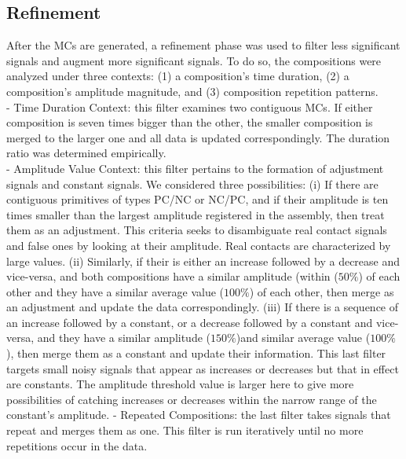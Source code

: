 \subsection{Refinement} \label{subsubsec:Refinement1}
After the MCs are generated, a refinement phase was used to filter less significant signals and augment more significant signals. To do so, the compositions were analyzed under three contexts: (1) a composition's time duration, (2) a composition's amplitude magnitude, and (3) composition repetition patterns.\\
- Time Duration Context: this filter examines two contiguous MCs. If either composition is seven times bigger than the other, the smaller composition is merged to the larger one and all data is updated correspondingly. The duration ratio was determined empirically.\\
- Amplitude Value Context: this filter pertains to the formation of adjustment signals and constant signals. We considered three possibilities:
(i) If there are contiguous primitives of types PC/NC or NC/PC, and if their amplitude is ten times smaller than the largest amplitude registered in the assembly, then treat them as an adjustment. This criteria seeks to disambiguate real contact signals and false ones by looking at their amplitude. Real contacts are characterized by large values.
(ii) Similarly, if their is either an increase followed by a decrease and vice-versa, and both compositions have a similar amplitude (within ($50\%$) of each other and they have a similar average value ($100\%$) of each other, then merge as an adjustment and update the data correspondingly.
(iii) If there is a sequence of an increase followed by a constant, or a decrease followed by a constant and vice-versa, and they have a similar amplitude ($150\%$)and similar average value ($100\%$), then merge them as a constant and update their information. This last filter targets small noisy signals that appear as increases or decreases but that in effect are constants. The amplitude threshold value is larger here to give more possibilities of catching increases or decreases within the narrow range of the constant's amplitude.
- Repeated Compositions: the last filter takes signals that repeat and merges them as one. This filter is run iteratively until no more repetitions occur in the data.\\
